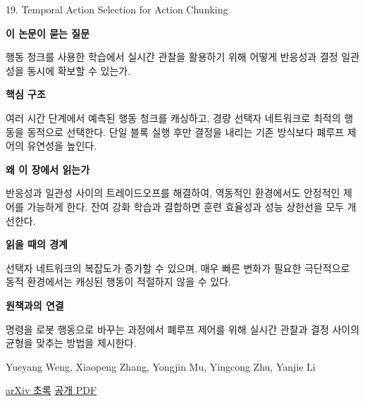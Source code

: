 \documentclass[11pt,openany]{book}
\begin{document}
\begin{termcard}{19. Temporal Action Selection for Action Chunking}

\par

\medskip

{\sffamily\bfseries\color{deepblue} 이 논문이 묻는 질문}\par

행동 청크를 사용한 학습에서 실시간 관찰을 활용하기 위해 어떻게 반응성과 결정 일관성을 동시에 확보할 수 있는가.

\smallskip

{\sffamily\bfseries\color{deepblue} 핵심 구조}\par

여러 시간 단계에서 예측된 행동 청크를 캐싱하고, 경량 선택자 네트워크로 최적의 행동을 동적으로 선택한다. 단일 블록 실행 후만 결정을 내리는 기존 방식보다 폐루프 제어의 유연성을 높인다.

\smallskip

{\sffamily\bfseries\color{deepblue} 왜 이 장에서 읽는가}\par

반응성과 일관성 사이의 트레이드오프를 해결하여, 역동적인 환경에서도 안정적인 제어를 가능하게 한다. 잔여 강화 학습과 결합하면 훈련 효율성과 성능 상한선을 모두 개선한다.

\smallskip

{\sffamily\bfseries\color{coral} 읽을 때의 경계}\par

선택자 네트워크의 복잡도가 증가할 수 있으며, 매우 빠른 변화가 필요한 극단적으로 동적 환경에서는 캐싱된 행동이 적절하지 않을 수 있다.

\smallskip

{\sffamily\bfseries\color{teal} 원책과의 연결}\par

명령을 로봇 행동으로 바꾸는 과정에서 폐루프 제어를 위해 실시간 관찰과 결정 사이의 균형을 맞추는 방법을 제시한다.

\medskip

{\footnotesize\color{muted} Yueyang Weng, Xiaopeng Zhang, Yongjin Mu, Yingcong Zhu, Yanjie Li\par

\href{https://arxiv.org/abs/2511.04421}{arXiv 초록} \quad \href{https://arxiv.org/pdf/2511.04421}{공개 PDF}\par}

\end{termcard}
\end{document}
